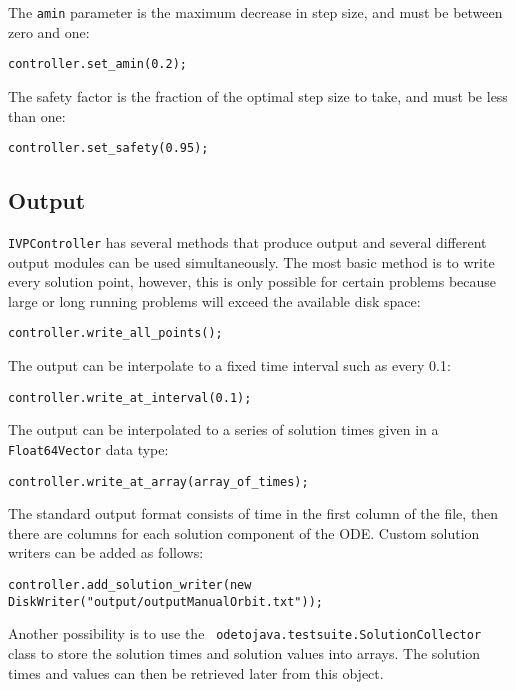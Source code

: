 \documentclass[10pt,letterpaper]{article}
\newcommand\Floatsfv{{\tt Float64Vector}}
\newcommand\ivpcont{{\tt IVPController}}
\begin{document}
The {\tt amin} parameter is the maximum decrease in step size, and must be
between zero and one:

\begin{lstlisting}
controller.set_amin(0.2);
\end{lstlisting}

The safety factor is the fraction of the optimal step size to take, and must be
less than one:

\begin{lstlisting}
controller.set_safety(0.95);
\end{lstlisting}

\subsection{Output}

\ivpcont{} has several methods that produce output and several different output
modules can be used simultaneously. The most basic method is to write every
solution point, however, this is only possible for certain problems because
large or long running problems will exceed the available disk space:

\begin{lstlisting}
controller.write_all_points();
\end{lstlisting}

The output can be interpolate to a fixed time interval such as every 0.1:

\begin{lstlisting}
controller.write_at_interval(0.1);
\end{lstlisting}

The output can be interpolated to a series of solution times given in a
\Floatsfv{} data type:

\begin{lstlisting}
controller.write_at_array(array_of_times);
\end{lstlisting}

The standard output format consists of time in the first column of the file,
then there are columns for each solution component of the ODE. Custom solution
writers can be added as follows:

\begin{lstlisting}
controller.add_solution_writer(new DiskWriter("output/outputManualOrbit.txt"));
\end{lstlisting}

Another possibility is to use the {\tt
odetojava.testsuite.SolutionCollector} class to store the solution times and
solution values into arrays. The solution times and values can then be retrieved
later from this object.
\end{document}
